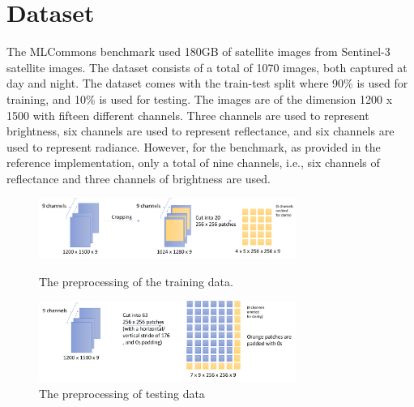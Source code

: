 \documentclass[sigplan,screen]{acmart}
\begin{document}
\section{Dataset} 


The MLCommons benchmark used 180GB of satellite images from Sentinel-3 satellite images. The dataset consists of a total of 1070 images, both captured at day and night. The dataset comes with the train-test split where 90\% is used for training, and 10\% is used for testing. 
The images are of the dimension 1200 x 1500 with fifteen different channels. Three channels are used to represent brightness, six channels are used to represent reflectance, and six channels are used to represent radiance. However, for the benchmark, as provided in the reference implementation, only a total of nine channels, i.e., six channels of reflectance and three channels of brightness are used. 

\begin{figure}[htb]

\centering\includegraphics[width=0.75\textwidth]{images/cloudmask-preprocessing-training-data.pdf}
\caption{The preprocessing of the training data.}
\label{fig:preprocessing-training}

\bigskip

\centering\includegraphics[width=0.75\textwidth]{images/cloudmask-preprocessing-testing-data.pdf}
\caption{The preprocessing of testing data}
\label{fig:preprocessing-testing}

\end{figure}
\end{document}
